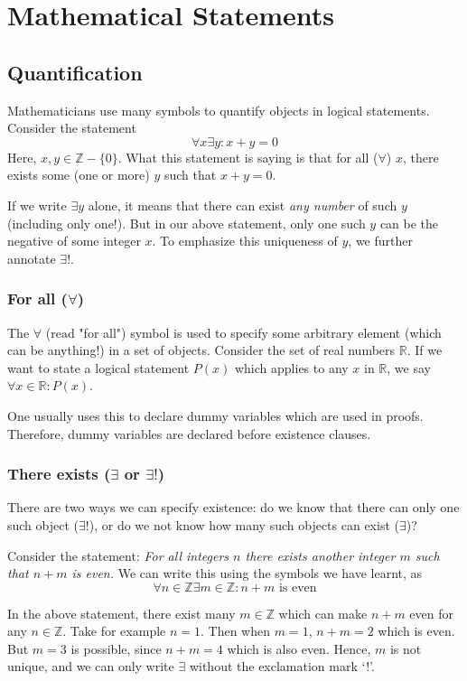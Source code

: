 \chapter{Mathematical Statements}
\section{Quantification}
Mathematicians use many symbols to quantify objects in logical statements. Consider the statement
\[
\forall x \exists y : x + y = 0
\]
Here, $x,y \in \mathbb{Z} - \{0\}$. What this statement is saying is that for all ($\forall$) $x$, there exists
some (one or more) $y$ such that $x + y = 0$.

If we write $\exists y$ alone, it means that there can exist \textit{any number} of such $y$ (including only one!).
But in our above statement, only one such $y$ can be the negative of some integer $x$. To emphasize this uniqueness
of $y$, we further annotate $\exists!$.

\subsection{For all ($\forall$)}
The $\forall$ (read "for all") symbol is used to specify some arbitrary element (which can be anything!) in a set
of objects. Consider the set of real numbers $\mathbb{R}$. If we want to state a logical statement $P(x)$ which
applies to any $x$ in $\mathbb{R}$, we say $\forall x \in \mathbb{R} : P(x)$.

One usually uses this to declare dummy variables which are used in proofs. Therefore, dummy variables
are declared before existence clauses.

\subsection{There exists ($\exists$ or $\exists!$)}
There are two ways we can specify existence: do we know that there can only one such object ($\exists!$),
or do we not know how many such objects can exist ($\exists$)?

Consider the statement: \textit{For all integers $n$ there exists another integer $m$ such that $n + m$ is even.}
We can write this using the symbols we have learnt, as
\[
\forall n \in \mathbb{Z} \exists m \in \mathbb {Z} : n + m \,\, \text{is even}
\]

In the above statement, there exist many $m \in \mathbb{Z}$ which can make $n + m$ even for any $n \in \mathbb{Z}$.
Take for example $n = 1$. Then when $m = 1$, $n + m = 2$ which is even. But $m = 3$ is possible, since $n + m = 4$
which is also even. Hence, $m$ is not unique, and we can only write $\exists$ without the exclamation mark `!'.

